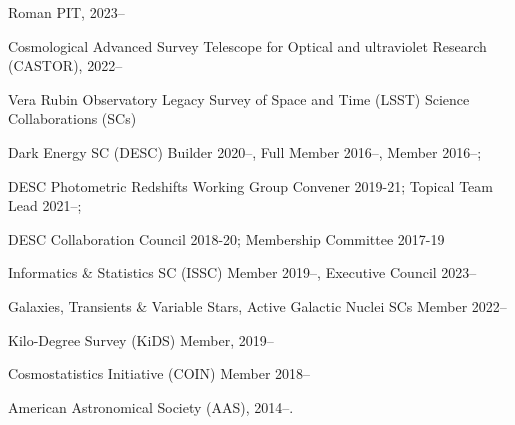 \documentclass[11pt,letterpaper]{article}
\begin{document}
%

\begin{list}{}{\malzlist}
	\item Roman PIT, 2023--
	\item Cosmological Advanced Survey Telescope for Optical and ultraviolet Research (CASTOR), 2022--
	\item Vera Rubin Observatory Legacy Survey of Space and Time (LSST) Science Collaborations (SCs)
	\begin{list}{}{\malzlist}
		\item Dark Energy SC (DESC) Builder 2020--, Full Member 2016--, Member 2016--;
		\item DESC Photometric Redshifts Working Group Convener 2019-21; Topical Team Lead 2021--;
		\item DESC Collaboration Council 2018-20; Membership Committee 2017-19
		\item Informatics \& Statistics SC (ISSC) Member 2019--, Executive Council 2023--%
		\item Galaxies, Transients \& Variable Stars, Active Galactic Nuclei SCs  Member 2022--
	\end{list}
	\item Kilo-Degree Survey (KiDS) Member, 2019--
	\item Cosmostatistics Initiative (COIN) Member 2018--
 \item American Astronomical Society (AAS), 2014--.
\end{list}
\end{document}
